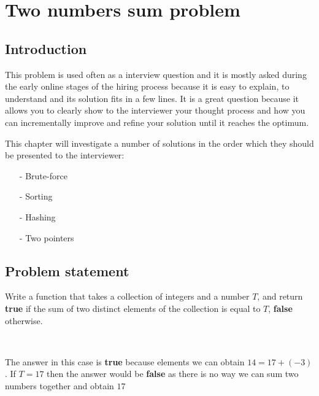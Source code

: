 %


\chapter{Two numbers sum problem}
\label{ch:two_numbers_sum}
\section*{Introduction}
This problem is used often as a interview question and it is mostly asked during the early online stages of the hiring process because it is easy to explain, to understand and its solution fits in a few lines. It is a great question because it allows you to clearly show to the interviewer your thought process and how you can incrementally improve and refine your solution until it reaches the optimum.

This chapter will investigate a number of solutions in the order which they should be presented to the interviewer:
\begin{itemize}
	\item[-] Brute-force
	\item[-] Sorting
	\item[-] Hashing
	\item[-] Two pointers
\end{itemize}

\section{Problem statement}

\begin{exercise}
Write a function that takes a collection of integers and a number $T$, and return \textbf{true} if the sum of two distinct elements of the collection is equal to $T$, \textbf{false} otherwise.
\end{exercise}


\begin{example}
\\ \hfill
	\begin{itemize}
		\item[-] 	$A=\{9, 4, 17, 42, 36, -3 ,15}\}$
		\item[-] 	$T = 14$
	\end{itemize}
The answer in this case is \textbf{true} because elements we can obtain $14=17+ (-3)$. 
If $T=17$ then the answer would be \textbf{false} as there is no way we can sum two numbers together and obtain $17$
\end{example}

